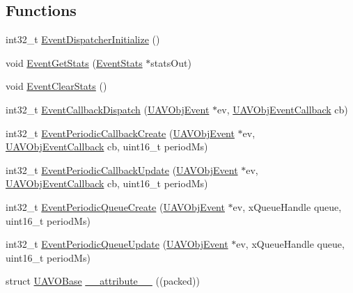 \subsection*{\-Functions}
\begin{DoxyCompactItemize}
\item 
int32\-\_\-t \hyperlink{group___u_a_v_object_handling_gabfbe02253807a718d938d5f14d264645}{\-Event\-Dispatcher\-Initialize} ()
\item 
void \hyperlink{group___u_a_v_object_handling_ga938822e7233dbbb444a5bdde8f626fae}{\-Event\-Get\-Stats} (\hyperlink{struct_event_stats}{\-Event\-Stats} $\ast$stats\-Out)
\item 
void \hyperlink{group___u_a_v_object_handling_ga17f7c06410e7f0c04e1d1df6beee93d4}{\-Event\-Clear\-Stats} ()
\item 
int32\-\_\-t \hyperlink{group___u_a_v_object_handling_gaff090284e03d5655f766c9c6dd27f555}{\-Event\-Callback\-Dispatch} (\hyperlink{struct_u_a_v_obj_event}{\-U\-A\-V\-Obj\-Event} $\ast$ev, \hyperlink{targets_2_u_a_v_objects_2inc_2uavobjectmanager_8h_a33d11560e38b56dc904220fb0f785c28}{\-U\-A\-V\-Obj\-Event\-Callback} cb)
\item 
int32\-\_\-t \hyperlink{group___u_a_v_object_handling_ga34e9f120ad77feee68d20f0a22adeb51}{\-Event\-Periodic\-Callback\-Create} (\hyperlink{struct_u_a_v_obj_event}{\-U\-A\-V\-Obj\-Event} $\ast$ev, \hyperlink{targets_2_u_a_v_objects_2inc_2uavobjectmanager_8h_a33d11560e38b56dc904220fb0f785c28}{\-U\-A\-V\-Obj\-Event\-Callback} cb, uint16\-\_\-t period\-Ms)
\item 
int32\-\_\-t \hyperlink{group___u_a_v_object_handling_ga10f109820071bea9b310dce65a46d784}{\-Event\-Periodic\-Callback\-Update} (\hyperlink{struct_u_a_v_obj_event}{\-U\-A\-V\-Obj\-Event} $\ast$ev, \hyperlink{targets_2_u_a_v_objects_2inc_2uavobjectmanager_8h_a33d11560e38b56dc904220fb0f785c28}{\-U\-A\-V\-Obj\-Event\-Callback} cb, uint16\-\_\-t period\-Ms)
\item 
int32\-\_\-t \hyperlink{group___u_a_v_object_handling_gae4d288e110cd074d66fcd5ab8825cf10}{\-Event\-Periodic\-Queue\-Create} (\hyperlink{struct_u_a_v_obj_event}{\-U\-A\-V\-Obj\-Event} $\ast$ev, x\-Queue\-Handle queue, uint16\-\_\-t period\-Ms)
\item 
int32\-\_\-t \hyperlink{group___u_a_v_object_handling_ga5d68f0ec012a592f38691e782b636f8a}{\-Event\-Periodic\-Queue\-Update} (\hyperlink{struct_u_a_v_obj_event}{\-U\-A\-V\-Obj\-Event} $\ast$ev, x\-Queue\-Handle queue, uint16\-\_\-t period\-Ms)
\item 
struct \hyperlink{struct_u_a_v_o_base}{\-U\-A\-V\-O\-Base} \hyperlink{group___u_a_v_object_handling_ga4b0485179787b019d9da516583780bdf}{\-\_\-\-\_\-attribute\-\_\-\-\_\-} ((packed))

\end{DoxyCompactItemize}
